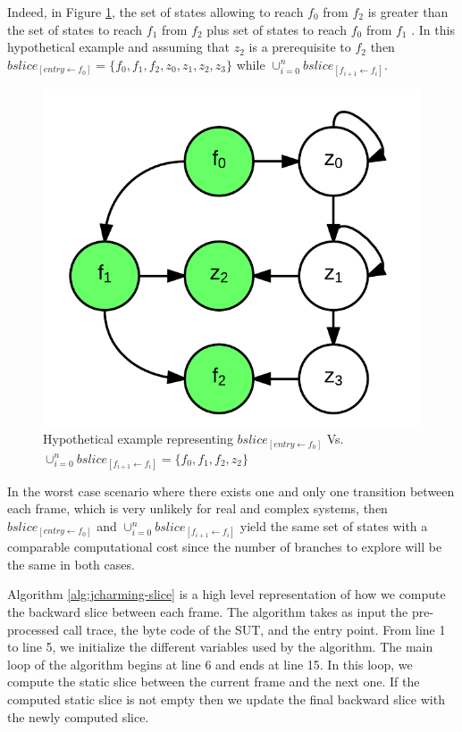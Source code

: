 \documentclass[times]{smrauth}
\begin{document}
Indeed, in Figure \ref{fig:jcharming-slice}, the set of states allowing to reach $f_0$ from
$f_2$ is greater than the set of states to reach $f_1$ from $f_2$ plus set
of states to reach $f_0$ from $f_1$ . In this hypothetical example and
assuming that $z_2$ is a prerequisite to $f_2$ then
$bslice_{[entry \leftarrow f_0]} = \{f_0 , f_1 , f_2 , z_0 , z_1 , z_2 , z_3 \}$
while $\cup_{i=0}^n bslice_{[f_{i+1} \leftarrow f_i]}$.

\begin{figure}[h!]
  \centering
    \includegraphics{media/jcharming-slices.png}
    \caption{Hypothetical example representing $bslice_{[entry \leftarrow f_0]}$ Vs. $\cup_{i=0}^n bslice_{[f_{i+1} \leftarrow f_i]} = \{f_0 , f_1 , f_2 , z_2 \}$
    \label{fig:jcharming-slice}}
\end{figure}

In the worst case scenario where there exists one and only one
transition between each frame, which is very unlikely for real
and complex systems, then $bslice_{[entry \leftarrow f_0]}$ and
 $\cup_{i=0}^n bslice_{[f_{i+1} \leftarrow f_i]}$ yield the same set of states with a
comparable computational cost since the number of branches
to explore will be the same in both cases.


Algorithm \ref{alg:jcharming-slice} is a high level
representation of how we compute the backward slice between
each frame. The algorithm takes as input the pre-processed
call trace, the byte code of the SUT, and the entry point. From
line 1 to line 5, we initialize the different variables used by the
algorithm. The main loop of the algorithm begins at line 6 and
ends at line 15. In this loop, we compute the static slice
between the current frame and the next one. If the computed
static slice is not empty then we update the final backward
slice with the newly computed slice. 
\end{document}
